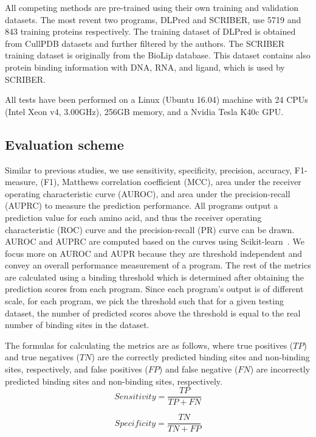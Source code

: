 \documentclass{bioinfo}
\begin{document}
All competing methods are pre-trained using their own training and validation datasets. The most revent two programs, DLPred and SCRIBER, use 5719 and 843 training proteins respectively. The training dataset of DLPred is obtained from CullPDB datasets \citep{wang2003pisces} and further filtered by the authors. The SCRIBER training dataset is originally from the BioLip database. This dataset contains also protein binding information with DNA, RNA, and ligand, which is used by SCRIBER.

All tests have been performed on a Linux (Ubuntu 16.04) machine with 24 CPUs (Intel Xeon v4, 3.00GHz), 256GB memory, and a Nvidia Tesla K40c GPU.

\subsection{Evaluation scheme}
Similar to previous studies, we use sensitivity, specificity, precision, accuracy, F1-measure, (F1), Matthews correlation coefficient (MCC), area under the receiver operating characteristic curve (AUROC), and area under the precision-recall (AUPRC) to measure the prediction performance. All programs output a prediction value for each amino acid, and thus the receiver operating characteristic (ROC) curve and the precision-recall (PR) curve can be drawn. AUROC and AUPRC are computed based on the curves using Scikit-learn~\citep{scikit-learn}. We focus more on AUROC and AUPR because they are threshold independent and convey an overall performance measurement of a program. The rest of the metrics are calculated using a binding threshold which is determined after obtaining the prediction scores from each program. Since each program's output is of different scale, for each program, we pick the threshold such that for a given testing dataset, the number of predicted scores above the threshold is equal to the real number of binding sites in the dataset. 

The formulas for calculating the metrics are as follows, where true positives ($TP$) and true negatives ($TN$) are the correctly predicted binding sites and non-binding sites, respectively, and false positives ($FP$) and false negative ($FN$) are incorrectly predicted binding sites and non-binding sites, respectively.
\begin{equation}
\textit{Sensitivity} = \frac{TP}{TP+FN}
\end{equation}

\begin{equation}
\textit{Specificity} = \frac{TN}{TN+FP}
\end{equation}
\end{document}
